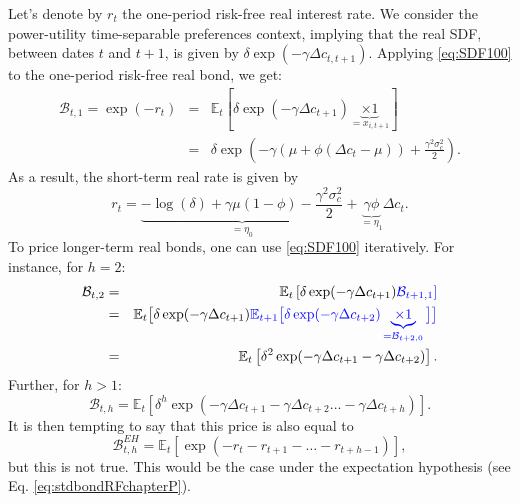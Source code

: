 \documentclass[
  12pt,
]{book}
\theoremstyle{definition}
\theoremstyle{definition}
\theoremstyle{definition}
\theoremstyle{definition}
\theoremstyle{remark}
\begin{document}
Let's denote by \(r_{t}\) the one-period risk-free real interest rate. We consider the power-utility time-separable preferences context, implying that the real SDF, between dates \(t\) and \(t+1\), is given by \(\delta\exp(-\gamma \Delta c_{t,t+1})\). Applying \eqref{eq:SDF100} to the one-period risk-free real bond, we get:
\begin{eqnarray*}
\mathcal{B}_{t,1} = \exp(-r_{t}) &=& \mathbb{E}_t [ \delta \exp(-\gamma \Delta c_{t+1}) \underbrace{\times 1}_{= x_{i,t+1}} ]\\
&=& \delta \exp\left(-\gamma(\mu + \phi (\Delta c_t - \mu))+\frac{\gamma^2\sigma_c^2}{2}\right).
\end{eqnarray*}
As a result, the short-term real rate is given by
\begin{equation}
r_{t} = \underbrace{- \log(\delta) + \gamma \mu (1-\phi)  - \frac{\gamma^2\sigma_c^2}{2}}_{=\eta_0} + \underbrace{\gamma \phi}_{=\eta_1} \Delta c_t.\label{eq:rCCAPM}
\end{equation}
To price longer-term real bonds, one can use \eqref{eq:SDF100} iteratively. For instance, for \(h=2\):
\begin{eqnarray*}
\mathcal{B}_{t,2} &=&  \mathbb{E}_t \left[ \delta \exp(-\gamma \Delta c_{t+1}) \color{blue}{\mathcal{B}_{t+1,1}} \right]\\
&=& \mathbb{E}_t \big[ \delta \exp(-\gamma \Delta c_{t+1}) \color{blue}{\mathbb{E}_{t+1} \big[ \delta \exp(-\gamma \Delta c_{t+2}) \underbrace{\times 1}_{=\mathcal{B}_{t+2,0}} \big]} \big]\\
&=& \mathbb{E}_t \left[ \delta^2 \exp(-\gamma \Delta c_{t+1} - \gamma \Delta c_{t+2}) \right].
\end{eqnarray*}
Further, for \(h>1\):
\begin{equation}
\mathcal{B}_{t,h} = \mathbb{E}_t \left[ \delta^h \exp(-\gamma \Delta c_{t+1} - \gamma \Delta c_{t+2} \dots - \gamma \Delta c_{t+h}) \right].\label{eq:PthCCAPM}
\end{equation}
It is then tempting to say that this price is also equal to
\begin{equation}
\mathcal{B}^{EH}_{t,h} = \mathbb{E}_t \left[ \exp(- r_{t} - r_{t+1} - \dots - r_{t+h-1}) \right],\label{eq:CCAPMEH}
\end{equation}
but this is not true. This would be the case under the expectation hypothesis (see Eq. \eqref{eq:stdbondRFchapterP}).
\end{document}
